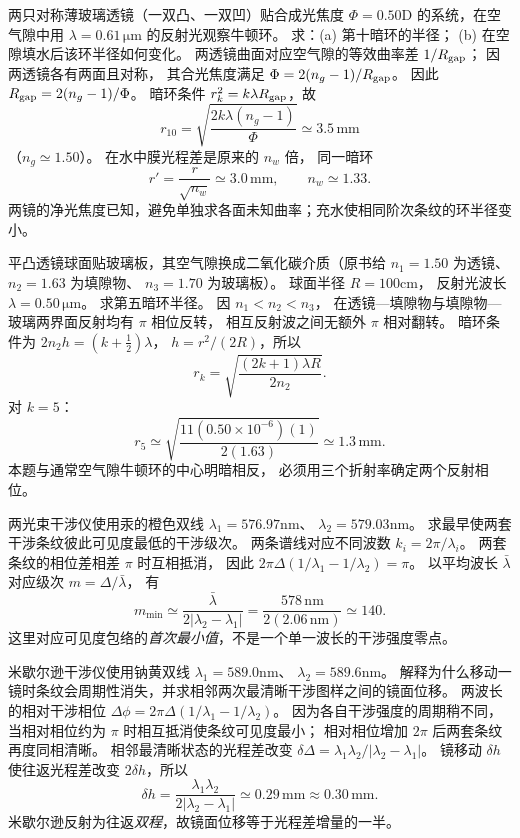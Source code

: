 两只对称薄玻璃透镜（一双凸、一双凹）贴合成光焦度
$\Phi=0.50$D 的系统，在空气隙中用
$\lambda=0.61\,\mathrm{\mu m}$ 的反射光观察牛顿环。
求：(a) 第十暗环的半径；
(b) 在空隙填水后该环半径如何变化。
\exsolution
两透镜曲面对应空气隙的等效曲率差
$1/R_{\rm gap}$；
因两透镜各有两面且对称，
其合光焦度满足
$\Phi=2(n_g-1)/R_{\rm gap}$。
因此
$R_{\rm gap}=2(n_g-1)/\Phi$。
暗环条件
$r_k^2=k\lambda R_{\rm gap}$，故
\[
\boxed{r_{10}=
\sqrt{\frac{2k\lambda(n_g-1)}{\Phi}}
\simeq3.5\,\mathrm{mm}}
\]
（$n_g\simeq1.50$）。
在水中膜光程差是原来的 $n_w$ 倍，
同一暗环
\[
\boxed{r'=\frac r{\sqrt{n_w}}
\simeq3.0\,\mathrm{mm}},\qquad n_w\simeq1.33.
\]
\excheck 两镜的净光焦度已知，避免单独求各面未知曲率；充水使相同阶次条纹的环半径变小。

平凸透镜球面贴玻璃板，其空气隙换成二氧化碳介质（原书给
$n_1=1.50$ 为透镜、
$n_2=1.63$ 为填隙物、
$n_3=1.70$ 为玻璃板）。
球面半径 $R=100$cm，
反射光波长 $\lambda=0.50\,\mathrm{\mu m}$。
求第五暗环半径。
\exsolution
因 $n_1<n_2<n_3$，
在透镜—填隙物与填隙物—玻璃两界面反射均有 $\pi$ 相位反转，
相互反射波之间无额外 $\pi$ 相对翻转。
暗环条件为
$2n_2h=(k+\tfrac12)\lambda$，
$h=r^2/(2R)$，所以
\[
\boxed{r_k=
\sqrt{\frac{(2k+1)\lambda R}{2n_2}}}.
\]
对 $k=5$：
\[
\boxed{r_5\simeq
\sqrt{\frac{11(0.50\times10^{-6})(1)}
{2(1.63)}}
\simeq1.3\,\mathrm{mm}}.
\]
\excheck 本题与通常空气隙牛顿环的中心明暗相反，
必须用三个折射率确定两个反射相位。

两光束干涉仪使用汞的橙色双线
$\lambda_1=576.97$nm、
$\lambda_2=579.03$nm。
求最早使两套干涉条纹彼此可见度最低的干涉级次。
\exsolution
两条谱线对应不同波数
$k_i=2\pi/\lambda_i$。
两套条纹的相位差相差 $\pi$ 时互相抵消，
因此
$2\pi\Delta(1/\lambda_1-1/\lambda_2)=\pi$。
以平均波长 $\bar\lambda$ 对应级次
$m=\Delta/\bar\lambda$，
有
\[
\boxed{m_{\min}\simeq
\frac{\bar\lambda}{2|\lambda_2-\lambda_1|}
=\frac{578\,\mathrm{nm}}{2(2.06\,\mathrm{nm})}
\simeq140}.
\]
\excheck 这里对应可见度包络的\emph{首次最小值}，不是一个单一波长的干涉强度零点。

米歇尔逊干涉仪使用钠黄双线
$\lambda_1=589.0$nm、
$\lambda_2=589.6$nm。
解释为什么移动一镜时条纹会周期性消失，并求相邻两次最清晰干涉图样之间的镜面位移。
\exsolution
两波长的相对干涉相位
$\Delta\phi=2\pi\Delta(1/\lambda_1-1/\lambda_2)$。
因为各自干涉强度的周期稍不同，
当相对相位约为 $\pi$ 时相互抵消使条纹可见度最小；
相对相位增加 $2\pi$ 后两套条纹再度同相清晰。
相邻最清晰状态的光程差改变
$\delta\Delta=\lambda_1\lambda_2/|\lambda_2-\lambda_1|$。
镜移动 $\delta h$ 使往返光程差改变
$2\delta h$，所以
\[
\boxed{\delta h=
\frac{\lambda_1\lambda_2}{2|\lambda_2-\lambda_1|}
\simeq0.29\,\mathrm{mm}\approx0.30\,\mathrm{mm}}.
\]
\excheck 米歇尔逊反射为往返\emph{双程}，故镜面位移等于光程差增量的一半。

